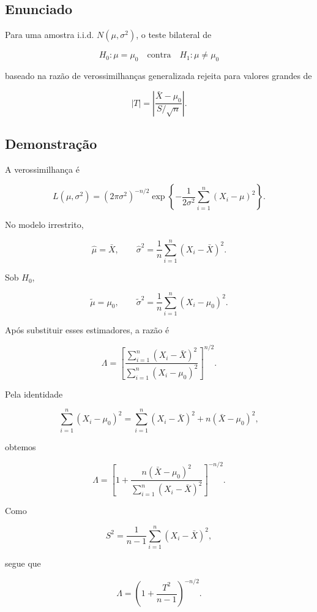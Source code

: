 \documentclass[
  letterpaper,
  DIV=11,
  numbers=noendperiod]{scrreprt}
\begin{document}

\subsection*{Enunciado}\label{enunciado-19}

Para uma amostra i.i.d. \(N(\mu,\sigma^2)\), o teste bilateral de

\[
H_0:\mu=\mu_0
\quad\text{contra}\quad
H_1:\mu\neq\mu_0
\]

baseado na razão de verossimilhanças generalizada rejeita para valores
grandes de

\[
|T|=
\left|
\frac{\bar X-\mu_0}{S/\sqrt n}
\right|.
\]

\subsection*{Demonstração}\label{demonstrauxe7uxe3o-20}

A verossimilhança é

\[
L(\mu,\sigma^2)
=
(2\pi\sigma^2)^{-n/2}
\exp\left
\{-\frac{1}{2\sigma^2}
\sum_{i=1}^n(X_i-\mu)^2
\right\}.
\]

No modelo irrestrito,

\[
\widehat\mu=\bar X,
\qquad
\widehat\sigma^2=
\frac{1}{n}
\sum_{i=1}^n(X_i-\bar X)^2.
\]

Sob \(H_0\),

\[
\widetilde\mu=\mu_0,
\qquad
\widetilde\sigma^2=
\frac{1}{n}
\sum_{i=1}^n(X_i-\mu_0)^2.
\]

Após substituir esses estimadores, a razão é

\[
\Lambda
=
\left[
\frac{
\sum_{i=1}^n(X_i-\bar X)^2
}{
\sum_{i=1}^n(X_i-\mu_0)^2
}
\right]^{n/2}.
\]

Pela identidade

\[
\sum_{i=1}^n(X_i-\mu_0)^2
=
\sum_{i=1}^n(X_i-\bar X)^2
+n(\bar X-\mu_0)^2,
\]

obtemos

\[
\Lambda
=
\left[
1+
\frac{n(\bar X-\mu_0)^2}
{\sum_{i=1}^n(X_i-\bar X)^2}
\right]^{-n/2}.
\]

Como

\[
S^2=
\frac{1}{n-1}
\sum_{i=1}^n(X_i-\bar X)^2,
\]

segue que

\[
\Lambda
=
\left(
1+
\frac{T^2}{n-1}
\right)^{-n/2}.
\]
\end{document}
